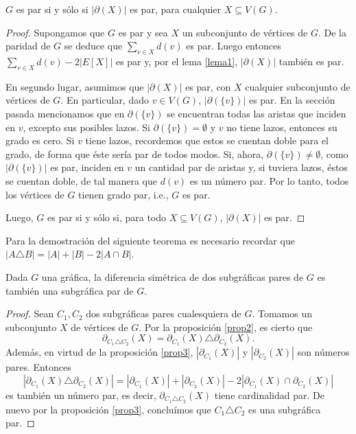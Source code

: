 \begin{prop} \label{prop3}
$G$ es par si y sólo si $|\partial(X)|$ es par, para cualquier $X \subseteq V(G)$.
 
\end{prop}

\begin{proof}
Supongamos que $G$ es par y sea $X$ un subconjunto de vértices de $G$. De la paridad de $G$ se deduce que $\sum_{v \in X} d(v)$ es par. Luego entonces $\sum _{v \in X} d(v)- 2 \big |E[X]\big |$ es par y, por el lema \ref{lema1}, $\big|\partial(X)\big|$ también es par.

En segundo lugar, asumimos que $\big|\partial(X)\big|$ es par, con $X$ cualquier subconjunto de vértices de $G$. En particular, dado $v \in V(G)$, $\big|\partial(\{v\})\big|$ es par. En la sección pasada mencionamos que en $\partial(\{v\})$ se encuentran todas las aristas que inciden en $v$, excepto sus posibles lazos. Si $\partial(\{v\}) = \emptyset$ y $v$ no tiene lazos, entonces su grado es cero. Si $v$ tiene lazos, recordemos que estos se cuentan doble para el grado, de forma que éste sería par de todos modos. Si, ahora, $\partial(\{v\}) \neq \emptyset$, como $\big| \partial(\{v\}) \big|$ es par, inciden en $v$ un cantidad par de aristas y, si tuviera lazos, éstos se cuentan doble, de tal manera que $d(v)$ es un número par. Por lo tanto, todos los vértices de $G$ tienen grado par, i.e., $G$ es par.

Luego, $G$ es par si y sólo si, para todo $X \subseteq V(G)$, $|\partial(X)|$ es par.

\end{proof}

Para la demostración del siguiente teorema es necesario recordar que $|A \triangle B| = |A|+|B| - 2|A \cap B|$.

\begin{teo} \label{teo:difsimciclos}
 Dada $G$ una gráfica, la diferencia simétrica de dos subgráficas pares de $G$ es también una subgráfica par de $G$.
\end{teo}

\begin{proof}
Sean $C_{1}, C_{2}$ dos subgráficas pares cualesquiera de $G$. Tomamos un subconjunto $X$ de vértices de $G$. Por la proposición \ref{prop2}, es cierto que 
$$\partial_{C_{1} \triangle C_{2}}(X) = \partial_{C_{1}}(X) \triangle \partial_{C_{2}}(X).$$
Además, en virtud de la proposición \ref{prop3}, $|\partial_{C_{1}}(X)|$ y $|\partial_{C_{2}}(X)|$ son números pares. Entonces 
$$|\partial_{C_{1}}(X) \triangle \partial_{C_{2}}(X)| = |\partial_{C_{1}}(X)| + |\partial_{C_{2}}(X)| - 2 |\partial_{C_{1}}(X) \cap \partial_{C_{2}}(X)|$$
es también un número par, es decir, $\partial_{C_{1} \triangle C_{2}}(X)$ tiene cardinalidad par. De nuevo por la proposición \ref{prop3}, concluímos que $C_{1} \triangle C_{2}$ es una subgráfica par.

\end{proof}

